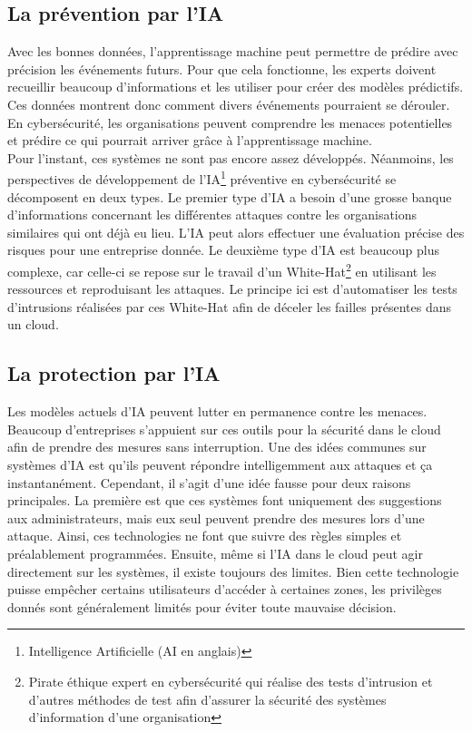 \documentclass[a4paper, 12pt]{article}
\begin{document}
\begin{spacing}{1.1}
    \subsection{La prévention par l'IA}
      Avec les bonnes données, l'apprentissage machine peut permettre de prédire
      avec précision les événements futurs. Pour que cela fonctionne, les
      experts doivent recueillir beaucoup d'informations et les utiliser pour
      créer des modèles prédictifs. Ces données montrent donc comment divers
      événements pourraient se dérouler. En cybersécurité, les organisations
      peuvent comprendre les menaces potentielles et prédire ce qui pourrait
      arriver grâce à l'apprentissage machine. \\

      Pour l’instant, ces systèmes ne sont pas encore assez développés.
      Néanmoins, les perspectives de développement de l’IA\footnote{Intelligence
      Artificielle (AI en anglais)} préventive en cybersécurité se décomposent
      en deux types. Le premier type d'IA a besoin d’une grosse banque
      d'informations concernant les différentes attaques contre les
      organisations similaires qui ont déjà eu lieu. L'IA peut alors effectuer
      une évaluation précise des risques pour une entreprise donnée. Le deuxième
      type d’IA est beaucoup plus complexe, car celle-ci se repose sur le
      travail d’un White-Hat\footnote{Pirate éthique expert en cybersécurité qui
      réalise des tests d'intrusion et d'autres méthodes de test afin d'assurer
      la sécurité des systèmes d'information d'une organisation} en utilisant
      les ressources et reproduisant les attaques. Le principe ici est
      d’automatiser les tests d’intrusions réalisées par ces White-Hat afin de
      déceler les failles présentes dans un cloud.

    \subsection{La protection par l'IA}
      Les modèles actuels d'IA peuvent lutter en permanence contre les
      menaces. Beaucoup d’entreprises s'appuient sur ces outils pour la sécurité
      dans le cloud afin de prendre des mesures sans interruption. Une des idées
      communes sur systèmes d'IA est qu'ils peuvent répondre intelligemment aux
      attaques et ça instantanément. Cependant, il s'agit d'une idée fausse pour
      deux raisons principales. La première est que ces systèmes font uniquement
      des suggestions aux administrateurs, mais eux seul peuvent prendre des
      mesures lors d'une attaque. Ainsi, ces technologies ne font que suivre des
      règles simples et préalablement programmées. Ensuite, même si l’IA dans le
      cloud peut agir directement sur les systèmes, il existe toujours des
      limites. Bien cette technologie puisse empêcher certains utilisateurs
      d'accéder à certaines zones, les privilèges donnés sont généralement
      limités pour éviter toute mauvaise décision. \\


\end{spacing}
\end{document}
